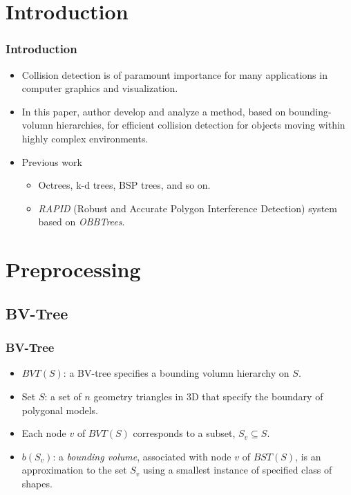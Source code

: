 \documentclass{beamer}
\begin{document}
\section{Introduction}
    \begin{frame}
    \frametitle{Introduction}
	\begin{itemize}
		\item Collision detection is of paramount importance for many applications in computer graphics and visualization.
		\item In this paper, author develop and analyze a method, based on bounding-volumn hierarchies, for efficient collision detection for objects moving within highly complex environments.
		\item Previous work
			\begin{itemize}
			\item Octrees, k-d trees, BSP trees, and so on.
			\item {\it RAPID} (Robust and Accurate Polygon Interference Detection) system based on {\it OBBTrees}.
			\end{itemize}
	\end{itemize}
    \end{frame}

\section{Preprocessing}

\subsection{BV-Tree}
	\begin{frame}
	\frametitle{BV-Tree}
		\begin{itemize}
			\item $BVT(S)$: a BV-tree specifies a bounding volumn hierarchy on $S$.
			\item Set $S$: a set of $n$ geometry triangles in 3D that specify the boundary of polygonal models.
			\item Each node $v$ of $BVT(S)$ corresponds to a subset, $S_{v} \subseteq S$.
			\item $b(S_{v})$: a {\it bounding volume}, associated with node $v$ of $BST(S)$, is an approximation to the set $S_{v}$ using a smallest instance of specified class of shapes.
		\end{itemize}
	\end{frame}
\end{document}
